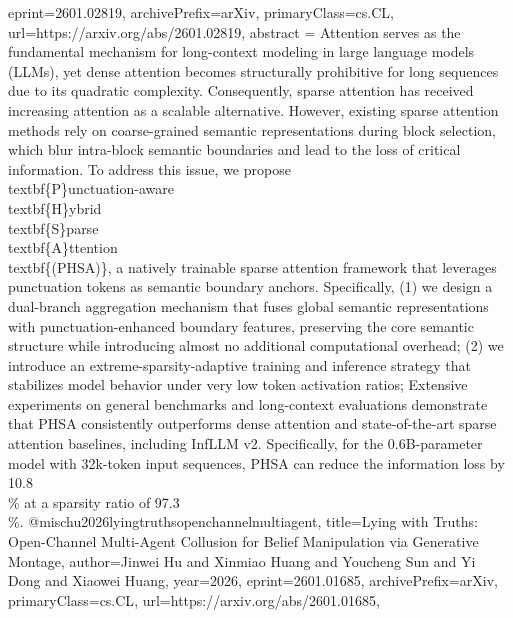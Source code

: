 {      eprint={2601.02819},
      archivePrefix={arXiv},
      primaryClass={cs.CL},
      url={https://arxiv.org/abs/2601.02819},
      abstract = {Attention serves as the fundamental mechanism for long-context modeling in large language models (LLMs), yet dense attention becomes structurally prohibitive for long sequences due to its quadratic complexity. Consequently, sparse attention has received increasing attention as a scalable alternative. However, existing sparse attention methods rely on coarse-grained semantic representations during block selection, which blur intra-block semantic boundaries and lead to the loss of critical information. To address this issue, we propose \\textbf\{P\}unctuation-aware \\textbf\{H\}ybrid \\textbf\{S\}parse \\textbf\{A\}ttention \\textbf\{(PHSA)\}, a natively trainable sparse attention framework that leverages punctuation tokens as semantic boundary anchors. Specifically, (1) we design a dual-branch aggregation mechanism that fuses global semantic representations with punctuation-enhanced boundary features, preserving the core semantic structure while introducing almost no additional computational overhead; (2) we introduce an extreme-sparsity-adaptive training and inference strategy that stabilizes model behavior under very low token activation ratios; Extensive experiments on general benchmarks and long-context evaluations demonstrate that PHSA consistently outperforms dense attention and state-of-the-art sparse attention baselines, including InfLLM v2. Specifically, for the 0.6B-parameter model with 32k-token input sequences, PHSA can reduce the information loss by 10.8\\\% at a sparsity ratio of 97.3\\\%.}
}@misc{hu2026lyingtruthsopenchannelmultiagent,
      title={Lying with Truths: Open-Channel Multi-Agent Collusion for Belief Manipulation via Generative Montage}, 
      author={Jinwei Hu and Xinmiao Huang and Youcheng Sun and Yi Dong and Xiaowei Huang},
      year={2026},
      eprint={2601.01685},
      archivePrefix={arXiv},
      primaryClass={cs.CL},
      url={https://arxiv.org/abs/2601.01685},
}

